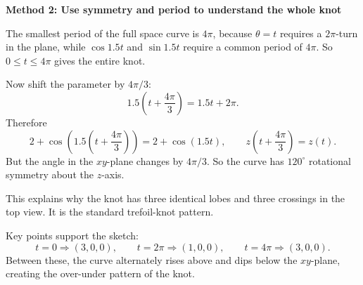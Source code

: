 \documentclass[a4paper,12pt,twocolumn]{article}
\newenvironment{solutionbox}{\begin{framed}}{\end{framed}}
\begin{document}
\begin{solutionbox}
\textbf{Method 2: Use symmetry and period to understand the whole knot}

\begin{steps}
\item The smallest period of the full space curve is \(4\pi\), because \(\theta=t\) requires a \(2\pi\)-turn in the plane, while \(\cos 1.5t\) and \(\sin 1.5t\) require a common period of \(4\pi\). So \(0\le t\le 4\pi\) gives the entire knot.

\item Now shift the parameter by \(4\pi/3\):
\[
1.5\left(t+\frac{4\pi}{3}\right)=1.5t+2\pi.
\]
Therefore
\[
2+\cos\!\left(1.5\left(t+\frac{4\pi}{3}\right)\right)=2+\cos(1.5t),
\qquad
z\left(t+\frac{4\pi}{3}\right)=z(t).
\]
But the angle in the \(xy\)-plane changes by \(4\pi/3\). So the curve has \(120^\circ\) rotational symmetry about the \(z\)-axis.

\item This explains why the knot has three identical lobes and three crossings in the top view. It is the standard trefoil-knot pattern.

\item Key points support the sketch:
\[
t=0\Rightarrow (3,0,0),\qquad
t=2\pi\Rightarrow (1,0,0),\qquad
t=4\pi\Rightarrow (3,0,0).
\]
Between these, the curve alternately rises above and dips below the \(xy\)-plane, creating the over-under pattern of the knot.
\end{steps}
\end{solutionbox}
\end{document}
